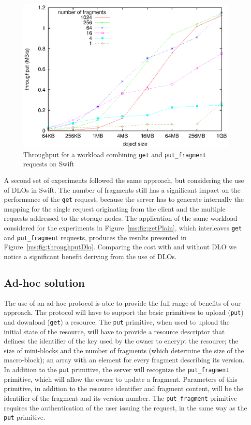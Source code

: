 \begin{figure}[t]
\centering
\includegraphics[width=0.8\columnwidth,valign=t]{figures/fig11}
\caption{\label{ms:fig:throughputMget}Throughput for a workload combining {\tt get} and {\tt put\_fragment} requests on Swift}
\end{figure}

A second set of experiments followed the same approach, but considering the use of DLOs in Swift. The number of fragments still has a significant impact on the performance of the {\tt get} request, because the server has to generate internally the mapping for the single request originating from the client and the multiple requests addressed to the storage nodes. The application of the same workload considered for the experiments in Figure~\ref{ms:fig:getPlain}, which interleaves {\tt get} and {\tt put\_fragment} requests, produces the results presented in Figure~\ref{ms:fig:throughputDlo}. Comparing the cost with and without DLO we notice a significant benefit deriving from the use of DLOs.

\subsection{Ad-hoc solution \label{ms:sec:adhoc}}
The use of an ad-hoc protocol is able to provide the full range of benefits of our approach. The protocol will have to support the basic primitives to upload ({\tt put}) and download ({\tt get}) a resource. The {\tt put} primitive, when used to upload the initial state of the resource, will have to provide a resource descriptor that defines: the identifier of the key  used by the owner to encrypt the resource; the size of mini-blocks and the number of fragments (which determine the size of the macro-block); an array with an element for every fragment describing its version. In addition to the {\tt put} primitive, the server will recognize the {\tt put\_fragment} primitive, which will allow the owner to update a fragment. Parameters of this primitive, in addition to the resource identifier and fragment content, will be the identifier of the fragment and its version number. The {\tt put\_fragment} primitive requires the authentication of the user issuing the request, in the same way as the {\tt put} primitive.

